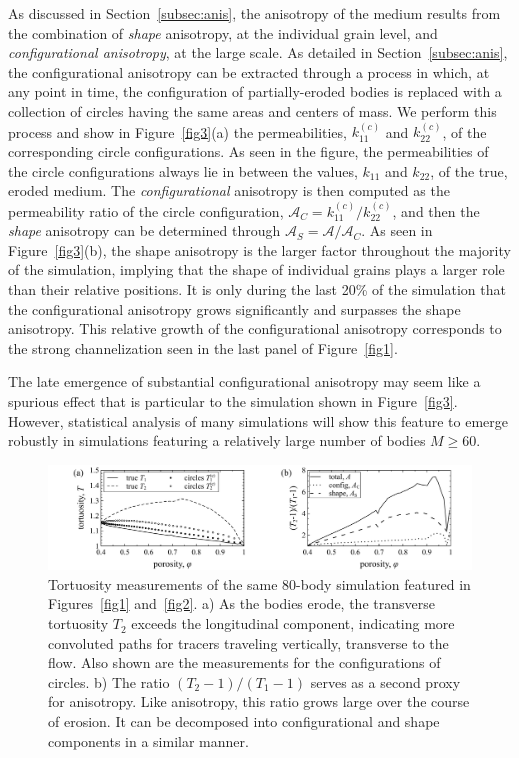 \documentclass[3p]{elsarticle}
\newcommand{\anis}{\mathcal{A}}
\begin{document}
As discussed in Section~\ref{subsec:anis}, the anisotropy of the medium results from the combination of {\em shape} anisotropy, at the individual grain level, and {\em configurational anisotropy}, at the large scale. As detailed in Section~\ref{subsec:anis}, the configurational anisotropy can be extracted through a process in which, at any point in time, the configuration of partially-eroded bodies is replaced with a collection of circles having the same areas and centers of mass. We perform this process and show in Figure~\ref{fig3}(a) the permeabilities, $k_{11}^{(c)}$ and $k_{22}^{(c)}$, of the corresponding circle configurations. As seen in the figure, the permeabilities of the circle configurations always lie in between the values, $k_{11}$ and $k_{22}$, of the true, eroded medium. The {\em configurational} anisotropy is then computed as the permeability ratio of the circle configuration, $\anis_C = k_{11}^{(c)} / k_{22}^{(c)}$, and then the {\em shape} anisotropy can be determined through $\anis_S = \anis/\anis_C$. As seen in Figure~\ref{fig3}(b), the shape anisotropy is the larger factor throughout the majority of the simulation, implying that the shape of individual grains plays a larger role than their relative positions. It is only during the last 20\% of the simulation that the configurational anisotropy grows significantly and surpasses the shape anisotropy. This relative growth of the configurational anisotropy corresponds to the strong channelization seen in the last panel of Figure~\ref{fig1}.

The late emergence of substantial configurational anisotropy may seem
like a spurious effect that is particular to the simulation shown in
Figure~\ref{fig3}. However, statistical analysis of many simulations will show this feature to emerge robustly in simulations featuring a relatively large number of bodies $M \ge 60$.

\begin{figure}%
\centering
\includegraphics[width = 0.99 \textwidth]{./figs/fig4.pdf}
\caption{
Tortuosity measurements of the same 80-body simulation featured in Figures~\ref{fig1} and~\ref{fig2}. a) As the bodies erode, the transverse tortuosity $T_2$ exceeds the longitudinal component, indicating more convoluted paths for tracers traveling vertically, transverse to the flow. Also shown are the measurements for the configurations of circles. b) The ratio $(T_2-1)/(T_1-1)$ serves as a second proxy for anisotropy. Like anisotropy, this ratio grows large over the course of erosion. It can be decomposed into configurational and shape components in a similar manner.
\label{fig4}
}
\end{figure}
\end{document}
